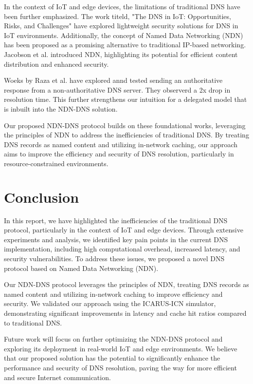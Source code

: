 \documentclass[conference]{IEEEtran}
\begin{document}
In the context of IoT and edge devices, the limitations of traditional DNS have been further emphasized. The work titeld, "The DNS in IoT: Opportunities, Risks, and Challenges" \cite{dns-iot} have explored lightweight security solutions for DNS in IoT environments. Additionally, the concept of Named Data Networking (NDN) has been proposed as a promising alternative to traditional IP-based networking. Jacobson et al. \cite{jacobson2009networking} introduced NDN, highlighting its potential for efficient content distribution and enhanced security.

Woeks by Raza et al. \cite{dns-dele} have explored annd tested sending an authoritative response from a non-authoritative DNS server. They observerd a 2x drop in resolution time. This further strengthens our intuition for a delegated model that is inbuilt into the NDN-DNS solution.

Our proposed NDN-DNS protocol builds on these foundational works, leveraging the principles of NDN to address the inefficiencies of traditional DNS. By treating DNS records as named content and utilizing in-network caching, our approach aims to improve the efficiency and security of DNS resolution, particularly in resource-constrained environments.

\section{Conclusion}
In this report, we have highlighted the inefficiencies of the traditional DNS protocol, particularly in the context of IoT and edge devices. Through extensive experiments and analysis, we identified key pain points in the current DNS implementation, including high computational overhead, increased latency, and security vulnerabilities. To address these issues, we proposed a novel DNS protocol based on Named Data Networking (NDN).

Our NDN-DNS protocol leverages the principles of NDN, treating DNS records as named content and utilizing in-network caching to improve efficiency and security. We validated our approach using the ICARUS-ICN simulator, demonstrating significant improvements in latency and cache hit ratios compared to traditional DNS.

Future work will focus on further optimizing the NDN-DNS protocol and exploring its deployment in real-world IoT and edge environments. We believe that our proposed solution has the potential to significantly enhance the performance and security of DNS resolution, paving the way for more efficient and secure Internet communication.



\end{document}

